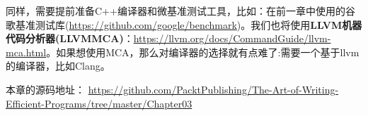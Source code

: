 同样，需要提前准备C++编译器和微基准测试工具，比如：在前一章中使用的谷歌基准测试库(\url{https://github.com/google/benchmark})。我们也将使用\textbf{LLVM机器代码分析器(LLVMMCA)}：\url{https://llvm.org/docs/CommandGuide/llvm-mca.html}。如果想使用MCA，那么对编译器的选择就有点难了:需要一个基于llvm的编译器，比如Clang。

本章的源码地址： \url{https://github.com/PacktPublishing/The-Art-of-Writing-Efficient-Programs/tree/master/Chapter03}